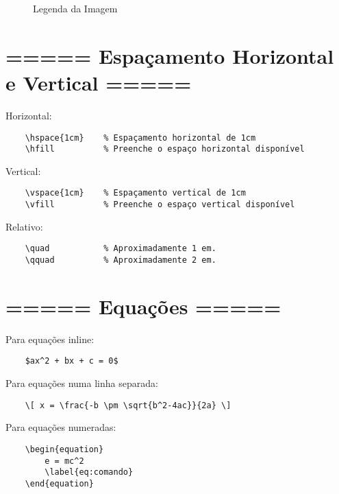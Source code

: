 \begin{figure}[htbp]
    \centering
    \caption{Legenda da Imagem}
    \label{fig:comandoCompleto}
\end{figure}


\section{===== Espaçamento Horizontal e Vertical =====}

Horizontal:
\begin{verbatim}
    \hspace{1cm}    % Espaçamento horizontal de 1cm
    \hfill          % Preenche o espaço horizontal disponível
\end{verbatim}

Vertical:
\begin{verbatim}
    \vspace{1cm}    % Espaçamento vertical de 1cm
    \vfill          % Preenche o espaço vertical disponível
\end{verbatim}

Relativo:
\begin{verbatim}
    \quad           % Aproximadamente 1 em.
    \qquad          % Aproximadamente 2 em.
\end{verbatim}


\section{===== Equações =====}

Para equações inline:

\begin{verbatim}
    $ax^2 + bx + c = 0$
\end{verbatim}

Para equações numa linha separada:

\begin{verbatim}
    \[ x = \frac{-b \pm \sqrt{b^2-4ac}}{2a} \]
\end{verbatim}

Para equações numeradas:

\begin{verbatim}
    \begin{equation}
        e = mc^2
        \label{eq:comando}
    \end{equation}
\end{verbatim}

